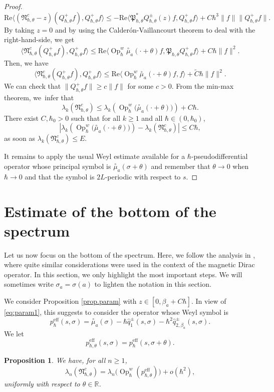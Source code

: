 \documentclass[JEP,XML,SOM,Unicode,NoFloatCountersInSection,published]{cedram}
\newcommand{\eff}{\mathrm{eff}}
\DeclareMathOperator{\Op}{Op}
\theoremstyle{plain}
\newtheorem{proposition}[theorem]{Proposition}
\theoremstyle{definition}
\renewcommand{\Re}{\mathrm{Re}}
\begin{document}
\begin{proof}
\[
\Re\langle(\mathfrak{N}^c_{\hbar,\theta}-z)(Q^+_{\hbar,\theta}f),Q^+_{\hbar,\theta}f\rangle\leq -\Re\langle \mathfrak{P}^*_{\hbar,\theta}Q^\pm_{\hbar,\theta}(z)f,Q^+_{\hbar,\theta}f\rangle+C\hbar^3\|f\|\|Q^+_{\hbar,\theta}f\|.
\]
By taking $z=0$ and by using the Calderón-Vaillancourt theorem to deal with the right-hand-side, we get
\[
\langle\mathfrak{N}^c_{\hbar,\theta}(Q^+_{\hbar,\theta}f),Q^+_{\hbar,\theta}f\rangle\leq \Re\langle \Op^w_\hbar\overset{\circ}{\mu}_a(\cdot+\theta)f,\mathfrak{P}_{\hbar,\theta}Q^+_{\hbar,\theta}f\rangle+C\hbar\|f\|^2.
\]
Then, we have
\[
\langle\mathfrak{N}^c_{\hbar,\theta}(Q^+_{\hbar,\theta}f),Q^+_{\hbar,\theta}f\rangle\leq \Re\langle \Op^w_\hbar\overset{\circ}{\mu}_a(\cdot+\theta)f,f\rangle+\tilde C\hbar\|f\|^2.
\]
We can check that $\|Q^+_{\hbar,\theta}f\|\geq c\|f\|$ for some $c>0$.
From the min-max theorem, we~infer that
\[
\lambda_k(\mathfrak{N}^c_{\hbar,\theta})\leq \lambda_k\left(\Op^w_\hbar\bigl(\overset{\circ}{\mu}_a(\cdot+\theta)\bigr)\right)+C\hbar.
\]
There exist $C,\hbar_0>0$ such that for all $k\geq 1$ and all $\hbar\in(0,\hbar_0)$,
\[
\left|\lambda_k\left(\Op^w_\hbar\bigl(\overset{\circ}{\mu}_a(\cdot+\theta)\bigr)\right)- \lambda_k(\mathfrak{N}^c_{\hbar,\theta})\right|\leq C\hbar,
\]
as soon as $\lambda_k(\mathfrak{N}^c_{\hbar,\theta})\leq E$.

It remains to apply the usual Weyl estimate available for a $\hbar$-pseudodifferential operator whose principal symbol is $\overset{\circ}{\mu}_a(\sigma+\theta)$ and remember that $\theta\to0$ when $\hbar\to 0$ and that the symbol is $2L$-periodic with respect to $s$.
\end{proof}

\section{Estimate of the bottom of the spectrum}\label{sec:proofs}
Let us now focus on the bottom of the spectrum. Here, we follow the analysis in \cite[\S 8.3]{BLTRS21}, where quite similar considerations were used in the context of the magnetic Dirac operator. In this section, we only highlight the most important steps.
We will sometimes write $\sigma_a=\sigma(a)$ to lighten the notation in this section.

We consider Proposition \ref{prop.param} with $z\in[0,\beta_a+C\hbar]$. In view of \eqref{eq:param1}, this suggests to consider the operator whose Weyl symbol is
\begin{equation}\label{eq.exp.eff-symb}
p^{\eff}_\hbar(s,\sigma)=\overset{\circ}{\mu}_a(\sigma)-\hbar \hat q_{1}^\pm(s,\sigma)-\hbar^2\hat q_{2,\beta_a}^\pm(s,\sigma).
\end{equation}
We let
\[
p^{\eff}_{\hbar,\theta}(s,\sigma)= p^{\eff}_\hbar(s,\sigma + \theta).
\]
\begin{proposition}\label{prop.Nc-eff}
We have, for all $n\geq 1$,
\[
\lambda_n(\mathfrak{N}^c_{\hbar,\theta})=\lambda_n\bigl(\Op^w_\hbar (p^{\eff}_{\hbar,\theta})\bigr)+o(\hbar^{2}),
\]
uniformly with respect to $\theta\in\mathbb{R}$. 
\end{proposition}
\end{document}
